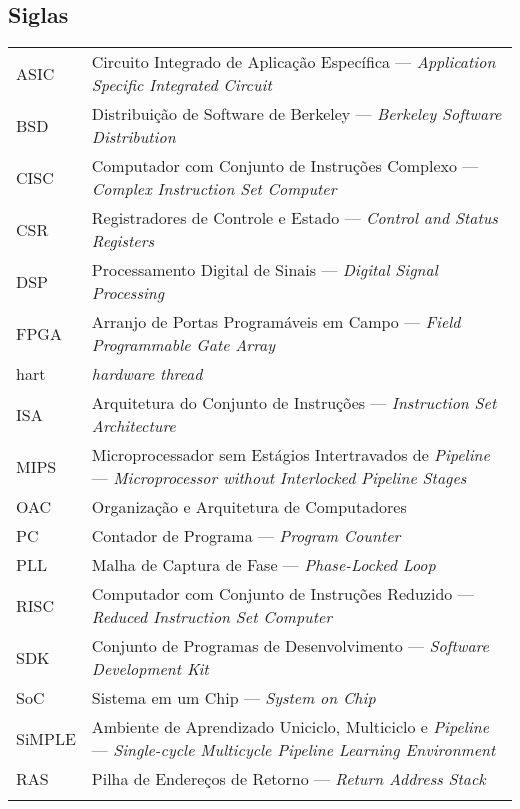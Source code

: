 


\subsection*{Siglas}

\begin{tabular}{p{}p{}}
    {ASIC}      & {Circuito Integrado de Aplicação Específica --- \textit{Application Specific Integrated Circuit}}\tabularnewline{}
    {BSD}       & {Distribuição de Software de Berkeley --- \textit{Berkeley Software Distribution}}\tabularnewline{}
    {CISC}      & {Computador com Conjunto de Instruções Complexo --- \textit{Complex Instruction Set Computer}} \tabularnewline{}
    {CSR}       & {Registradores de Controle e Estado --- \textit{Control and Status Registers}} \tabularnewline{}
    {DSP}       & {Processamento Digital de Sinais --- \textit{Digital Signal Processing}} \tabularnewline{}
    {FPGA}      & {Arranjo de Portas Programáveis em Campo --- \textit{Field Programmable Gate Array}} \tabularnewline{}
    {hart}      & {\textit{hardware thread}} \tabularnewline{}
    {ISA}       & {Arquitetura do Conjunto de Instruções --- \textit{Instruction Set Architecture}} \tabularnewline{}
    {MIPS}      & {Microprocessador sem Estágios Intertravados de \textit{Pipeline} --- \textit{Microprocessor without Interlocked Pipeline Stages}} \tabularnewline{}
    {OAC}       & {Organização e Arquitetura de Computadores} \tabularnewline{}
    {PC}        & {Contador de Programa --- \textit{Program Counter}} \tabularnewline{}
    {PLL}       & {Malha de Captura de Fase --- \textit{Phase-Locked Loop}} \tabularnewline{}
    {RISC}      & {Computador com Conjunto de Instruções Reduzido --- \textit{Reduced Instruction Set Computer}} \tabularnewline{}
    {SDK}       & {Conjunto de Programas de Desenvolvimento --- \textit{Software Development Kit}} \tabularnewline{}
    {SoC}       & {Sistema em um Chip --- \textit{System on Chip}} \tabularnewline{}
    {SiMPLE}    & {Ambiente de Aprendizado Uniciclo, Multiciclo e \textit{Pipeline} --- \textit{Single-cycle Multicycle Pipeline Learning Environment}} \tabularnewline{}
    {RAS}       & {Pilha de Endereços de Retorno --- \textit{Return Address Stack}} \tabularnewline{}
\end{tabular}
